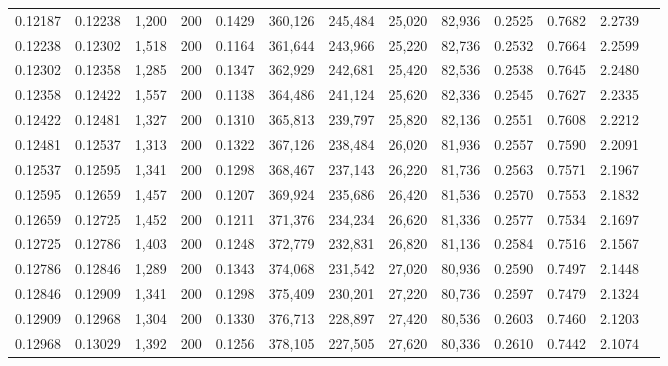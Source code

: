 \begin{tabular}{rrrrrrrrrrrrr}
0.12187 & 0.12238 &  1,200 & 200 &                                     0.1429 & 360,126 & 245,484 &  25,020 &  82,936 & 0.2525 & 0.7682 & 2.2739 \\
0.12238 & 0.12302 &  1,518 & 200 &                                     0.1164 & 361,644 & 243,966 &  25,220 &  82,736 & 0.2532 & 0.7664 & 2.2599 \\
0.12302 & 0.12358 &  1,285 & 200 &                                     0.1347 & 362,929 & 242,681 &  25,420 &  82,536 & 0.2538 & 0.7645 & 2.2480 \\
0.12358 & 0.12422 &  1,557 & 200 &                                     0.1138 & 364,486 & 241,124 &  25,620 &  82,336 & 0.2545 & 0.7627 & 2.2335 \\
0.12422 & 0.12481 &  1,327 & 200 &                                     0.1310 & 365,813 & 239,797 &  25,820 &  82,136 & 0.2551 & 0.7608 & 2.2212 \\
0.12481 & 0.12537 &  1,313 & 200 &                                     0.1322 & 367,126 & 238,484 &  26,020 &  81,936 & 0.2557 & 0.7590 & 2.2091 \\
0.12537 & 0.12595 &  1,341 & 200 &                                     0.1298 & 368,467 & 237,143 &  26,220 &  81,736 & 0.2563 & 0.7571 & 2.1967 \\
0.12595 & 0.12659 &  1,457 & 200 &                                     0.1207 & 369,924 & 235,686 &  26,420 &  81,536 & 0.2570 & 0.7553 & 2.1832 \\
0.12659 & 0.12725 &  1,452 & 200 &                                     0.1211 & 371,376 & 234,234 &  26,620 &  81,336 & 0.2577 & 0.7534 & 2.1697 \\
0.12725 & 0.12786 &  1,403 & 200 &                                     0.1248 & 372,779 & 232,831 &  26,820 &  81,136 & 0.2584 & 0.7516 & 2.1567 \\
0.12786 & 0.12846 &  1,289 & 200 &                                     0.1343 & 374,068 & 231,542 &  27,020 &  80,936 & 0.2590 & 0.7497 & 2.1448 \\
0.12846 & 0.12909 &  1,341 & 200 &                                     0.1298 & 375,409 & 230,201 &  27,220 &  80,736 & 0.2597 & 0.7479 & 2.1324 \\
0.12909 & 0.12968 &  1,304 & 200 &                                     0.1330 & 376,713 & 228,897 &  27,420 &  80,536 & 0.2603 & 0.7460 & 2.1203 \\
0.12968 & 0.13029 &  1,392 & 200 &                                     0.1256 & 378,105 & 227,505 &  27,620 &  80,336 & 0.2610 & 0.7442 & 2.1074 \\

\end{tabular}
